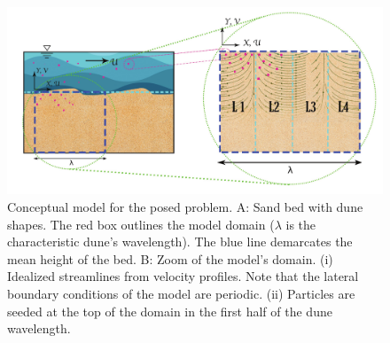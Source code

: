 \documentclass[draft,linenumbers]{agujournal2018}
\begin{document}
\begin{figure}[ht]
\centering
\includegraphics[trim=0.2cm 0.2cm 0.2cm 0.2cm, width=35pc]
{190404_ConceptualW.pdf}
\caption{Conceptual model for the posed problem. A: Sand bed with dune shapes. The red box outlines the model domain ($\lambda$ is the characteristic dune's wavelength). The blue line demarcates the mean height of the bed. B: Zoom of the model's domain. (i) Idealized streamlines from velocity profiles. Note that the lateral boundary conditions of the model are periodic. (ii) Particles are seeded at the top of the domain in the first half of the dune wavelength.}
\label{Conceptual}
\end{figure}
\end{document}
